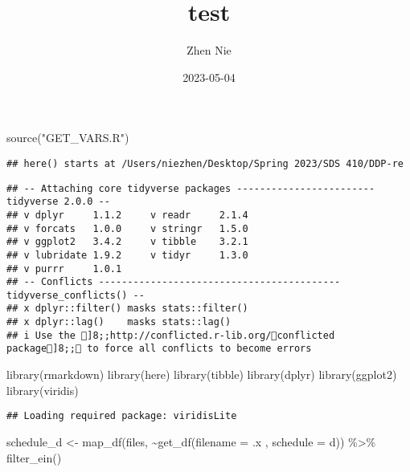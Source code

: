 \documentclass[
]{article}
\title{test}
\author{Zhen Nie}
\date{2023-05-04}
\newenvironment{Shaded}{\begin{snugshade}}{\end{snugshade}}
\newcommand{\AttributeTok}[1]{\textcolor[rgb]{0.77,0.63,0.00}{#1}}
\newcommand{\FunctionTok}[1]{\textcolor[rgb]{0.00,0.00,0.00}{#1}}
\newcommand{\NormalTok}[1]{#1}
\newcommand{\OtherTok}[1]{\textcolor[rgb]{0.56,0.35,0.01}{#1}}
\newcommand{\SpecialCharTok}[1]{\textcolor[rgb]{0.00,0.00,0.00}{#1}}
\newcommand{\StringTok}[1]{\textcolor[rgb]{0.31,0.60,0.02}{#1}}
\begin{document}
\maketitle

\begin{Shaded}
\begin{Highlighting}[]
\FunctionTok{source}\NormalTok{(}\StringTok{"GET\_VARS.R"}\NormalTok{)}
\end{Highlighting}
\end{Shaded}

\begin{verbatim}
## here() starts at /Users/niezhen/Desktop/Spring 2023/SDS 410/DDP-re
\end{verbatim}

\begin{verbatim}
## -- Attaching core tidyverse packages ------------------------ tidyverse 2.0.0 --
## v dplyr     1.1.2     v readr     2.1.4
## v forcats   1.0.0     v stringr   1.5.0
## v ggplot2   3.4.2     v tibble    3.2.1
## v lubridate 1.9.2     v tidyr     1.3.0
## v purrr     1.0.1     
## -- Conflicts ------------------------------------------ tidyverse_conflicts() --
## x dplyr::filter() masks stats::filter()
## x dplyr::lag()    masks stats::lag()
## i Use the ]8;;http://conflicted.r-lib.org/conflicted package]8;; to force all conflicts to become errors
\end{verbatim}

\begin{Shaded}
\begin{Highlighting}[]
\FunctionTok{library}\NormalTok{(rmarkdown)}
\FunctionTok{library}\NormalTok{(here)}
\FunctionTok{library}\NormalTok{(tibble)}
\FunctionTok{library}\NormalTok{(dplyr)}
\FunctionTok{library}\NormalTok{(ggplot2)}
\FunctionTok{library}\NormalTok{(viridis)}
\end{Highlighting}
\end{Shaded}

\begin{verbatim}
## Loading required package: viridisLite
\end{verbatim}

\begin{Shaded}
\begin{Highlighting}[]
\NormalTok{schedule\_d }\OtherTok{\textless{}{-}} \FunctionTok{map\_df}\NormalTok{(files, }\SpecialCharTok{\textasciitilde{}}\FunctionTok{get\_df}\NormalTok{(}\AttributeTok{filename =}\NormalTok{ .x , }
                              \AttributeTok{schedule =} \StringTok{\textquotesingle{}d\textquotesingle{}}\NormalTok{)) }\SpecialCharTok{\%\textgreater{}\%}
  \FunctionTok{filter\_ein}\NormalTok{()}
\end{Highlighting}
\end{Shaded}
\end{document}
